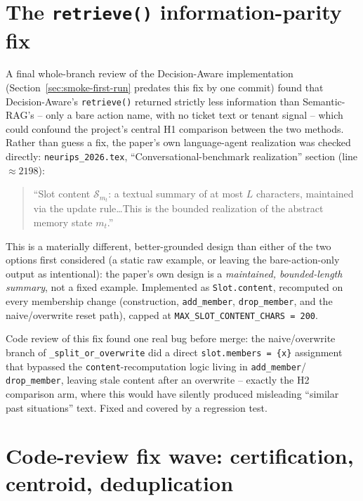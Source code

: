 \documentclass[11pt]{article}
\begin{document}
\section{The \texttt{retrieve()} information-parity fix}
\label{sec:retrieve-parity}

A final whole-branch review of the Decision-Aware implementation
(Section~\ref{sec:smoke-first-run} predates this fix by one commit)
found that Decision-Aware's \texttt{retrieve()} returned strictly less
information than Semantic-RAG's -- only a bare action name, with no
ticket text or tenant signal -- which could confound the project's
central H1 comparison between the two methods. Rather than guess a fix,
the paper's own language-agent realization was checked directly:
\texttt{neurips\_2026.tex}, ``Conversational-benchmark realization''
section (line $\approx 2198$):

\begin{quote}
``Slot content $\mathcal{S}_{m_t}$: a textual summary of at most $L$
characters, maintained via the update rule\ldots This is the bounded
realization of the abstract memory state $m_t$.''
\end{quote}

This is a materially different, better-grounded design than either of
the two options first considered (a static raw example, or leaving the
bare-action-only output as intentional): the paper's own design is a
\emph{maintained, bounded-length summary}, not a fixed example. Implemented
as \texttt{Slot.content}, recomputed on every membership change
(construction, \texttt{add\_member}, \texttt{drop\_member}, and the
naive/overwrite reset path), capped at \texttt{MAX\_SLOT\_CONTENT\_CHARS
= 200}.

Code review of this fix found one real bug before merge: the
naive/overwrite branch of \texttt{\_split\_or\_overwrite} did a direct
\texttt{slot.members = \{x\}} assignment that bypassed the
\texttt{content}-recomputation logic living in \texttt{add\_member}/
\texttt{drop\_member}, leaving stale content after an overwrite --
exactly the H2 comparison arm, where this would have silently produced
misleading ``similar past situations'' text. Fixed and covered by a
regression test.

\section{Code-review fix wave: certification, centroid, deduplication}
\label{sec:codereview-waves}
\end{document}
